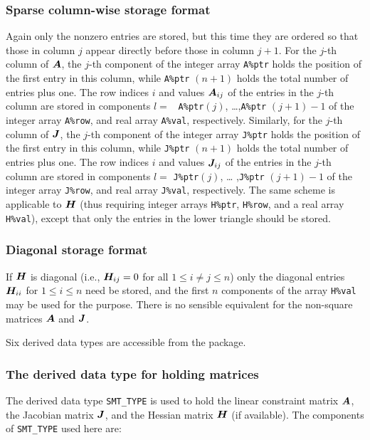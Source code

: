 \documentclass{galahad}
\begin{document}
\subsubsection{Sparse column-wise storage format}\label{columnwise}
Again only the nonzero entries are stored, but this time they are
ordered so that those in column $j$ appear directly before those in
column $j+1$. For the $j$-th column of ${\bm{A}}$, the $j$-th component of
the integer array {\tt A\%ptr} holds the position of the first entry in
this column, while {\tt A\%ptr} $(n+1)$ holds the total number of
entries plus one.  The row indices $i$ and values ${\bm{A}}_{ij}$ of the
entries in the $j$-th column are stored in components $l =$ {\tt
  A\%ptr}$(j)$, \ldots ,{\tt A\%ptr} $(j+1)-1$ of the integer array
{\tt A\%row}, and real array {\tt A\%val}, respectively.  Similarly,
for the $j$-th column of ${\bm{J}}$, the $j$-th component of the integer array
{\tt J\%ptr} holds the position of the first entry in this column,
while {\tt J\%ptr} $(n+1)$ holds the total number of entries plus one.
The row indices $i$ and values ${\bm{J}}_{ij}$ of the entries in the
$j$-th column are stored in components $l =$ {\tt J\%ptr}$(j)$, \ldots
,{\tt J\%ptr} $(j+1)-1$ of the integer array {\tt J\%row}, and real
array {\tt J\%val}, respectively.  The same scheme is applicable to
${\bm{H}}$ (thus requiring integer arrays {\tt H\%ptr}, {\tt H\%row}, and
a real array {\tt H\%val}), except that only the entries in the lower
triangle should be stored.

\subsubsection{Diagonal storage format}\label{diagonal}
If ${\bm{H}}$ is diagonal (i.e., ${\bm{H}}_{ij} = 0$ for all $1 \leq i \neq j \leq n$)
only the diagonal entries ${\bm{H}}_{ii}$ for $1 \leq i \leq n$ need be stored,
and the first $n$ components of the array {\tt H\%val} may be used for 
the purpose. There is no sensible equivalent for the non-square
matrices ${\bm{A}}$ and ${\bm{J}}$.





\galtypes
Six derived data types are accessible from the package.


\subsubsection{The derived data type for holding matrices}\label{typesmt}
The derived data type {\tt SMT\_TYPE} is used to hold the linear
constraint matrix ${\bm{A}}$, the Jacobian matrix ${\bm{J}}$, and the Hessian
matrix ${\bm{H}}$ (if available). The components of {\tt SMT\_TYPE}
used here are:
\end{document}

